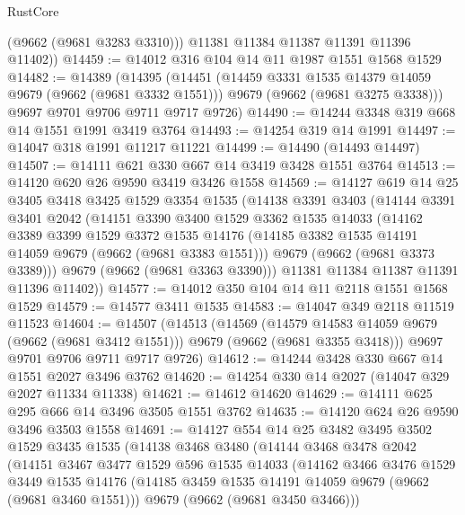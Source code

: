 \begin{lexlean}{RustCore}
\begin{coremodule}
          (@9662 (@9681 @3283 @3310)))
        @11381
        @11384
        @11387
        @11391
        @11396
        @11402))
@14459 := @14012 @316 @104 @14 @11 @1987 @1551 @1568 @1529
@14482 := @14389
    (@14395
      (@14451
        (@14459 @3331 @1535 @14379 @14059 @9679 (@9662 (@9681 @3332 @1551)))
        @9679
        (@9662 (@9681 @3275 @3338)))
      @9697
      @9701
      @9706
      @9711
      @9717
      @9726)
@14490 := @14244 @3348 @319 @668 @14 @1551 @1991 @3419 @3764
@14493 := @14254 @319 @14 @1991
@14497 := @14047 @318 @1991 @11217 @11221
@14499 := @14490 (@14493 @14497)
@14507 := @14111 @621 @330 @667 @14 @3419 @3428 @1551 @3764
@14513 := @14120 @620 @26 @9590 @3419 @3426 @1558
@14569 := @14127
    @619
    @14
    @25
    @3405
    @3418
    @3425
    @1529
    @3354
    @1535
    (@14138
      @3391
      @3403
      (@14144
        @3391
        @3401
        @2042
        (@14151
          @3390
          @3400
          @1529
          @3362
          @1535
          @14033
          (@14162
            @3389
            @3399
            @1529
            @3372
            @1535
            @14176
            (@14185 @3382 @1535 @14191 @14059 @9679 (@9662 (@9681 @3383 @1551)))
            @9679
            (@9662 (@9681 @3373 @3389)))
          @9679
          (@9662 (@9681 @3363 @3390)))
        @11381
        @11384
        @11387
        @11391
        @11396
        @11402))
@14577 := @14012 @350 @104 @14 @11 @2118 @1551 @1568 @1529
@14579 := @14577 @3411 @1535
@14583 := @14047 @349 @2118 @11519 @11523
@14604 := @14507
    (@14513
      (@14569
        (@14579 @14583 @14059 @9679 (@9662 (@9681 @3412 @1551)))
        @9679
        (@9662 (@9681 @3355 @3418)))
      @9697
      @9701
      @9706
      @9711
      @9717
      @9726)
@14612 := @14244 @3428 @330 @667 @14 @1551 @2027 @3496 @3762
@14620 := @14254 @330 @14 @2027 (@14047 @329 @2027 @11334 @11338)
@14621 := @14612 @14620
@14629 := @14111 @625 @295 @666 @14 @3496 @3505 @1551 @3762
@14635 := @14120 @624 @26 @9590 @3496 @3503 @1558
@14691 := @14127
    @554
    @14
    @25
    @3482
    @3495
    @3502
    @1529
    @3435
    @1535
    (@14138
      @3468
      @3480
      (@14144
        @3468
        @3478
        @2042
        (@14151
          @3467
          @3477
          @1529
          @596
          @1535
          @14033
          (@14162
            @3466
            @3476
            @1529
            @3449
            @1535
            @14176
            (@14185 @3459 @1535 @14191 @14059 @9679 (@9662 (@9681 @3460 @1551)))
            @9679
            (@9662 (@9681 @3450 @3466)))

\end{coremodule}
\end{lexlean}
